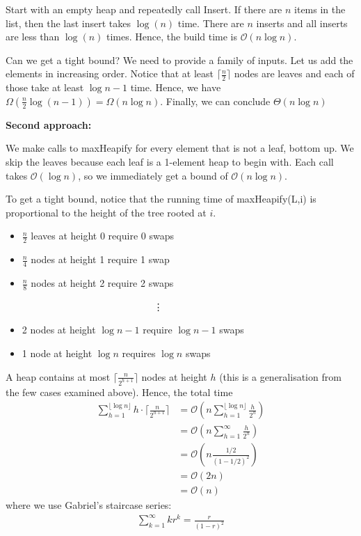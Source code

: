 \documentclass[11pt]{article}
\begin{document}
Start with an empty heap and repeatedly call Insert. If there are $n$ items in the list, then the last insert takes $\log(n)$ time. There are $n$ inserts and all inserts are less than $\log(n)$ times. Hence, the build time is $\mathcal{O}(n\log n)$. 

Can we get a tight bound? We need to provide a family of inputs. Let us add the elements in increasing order. Notice that at least $\lceil \frac{n}{2} \rceil$ nodes are leaves and each of those take at least $\log n -1 $ time. Hence, we have $\Omega (\frac{n}{2}\log (n - 1)) = \Omega(n \log n)$. Finally, we can conclude $\Theta(n \log n)$

\textbf{Second approach:}

We make calls to maxHeapify for every element that is not a leaf, bottom up. We skip the leaves because each leaf is a 1-element heap to begin with. Each call takes $\mathcal{O}(\log n)$, so we immediately get a bound of $\mathcal{O}(n \log n)$. 

To get a tight bound, notice that the running time of maxHeapify(L,i) is proportional to the height of the tree rooted at $i$. 
\begin{itemize}
    \item $\frac{n}{2}$ leaves at height 0 require 0 swaps
    \item $\frac{n}{4}$ nodes at height 1 require 1 swap 
    \item $\frac{n}{8}$ nodes at height 2 require 2 swaps 
    
    ~~~~~~~~~~~~~~~~~~~~~~~~~~~\vdots
    \item 2 nodes at height $\log n -1$ require $\log n - 1$ swaps
    \item 1 node at height $\log n$ requires $\log n$ swaps
\end{itemize}
A heap contains at most $\lceil \frac{n}{2^{h+1}} \rceil$ nodes at height $h$ (this is a generalisation from the few cases examined above). Hence, the total time 
\begin{align*}
    \sum_{h=1}^{\lfloor \log n \rfloor} h \cdot \lceil \frac{n}{2^{h+1}} \rceil &= \mathcal{O}(n \sum_{h=1}^{\lfloor \log n \rfloor} \frac{h}{2^h}) \\
    &= \mathcal{O} (n\sum_{h=1}^\infty \frac{h}{2^h}) \\
    &= \mathcal{O}(n\frac{1/2}{(1-1/2)^2}) \\
    &= \mathcal{O}(2n) \\
    &= \mathcal{O}(n)
\end{align*}
where we use Gabriel's staircase series: 
\begin{align*}
    \sum_{k=1}^\infty kr^k = \frac{r}{(1-r)^2} \tag{$0 < r < 1$}
\end{align*}
\end{document}

